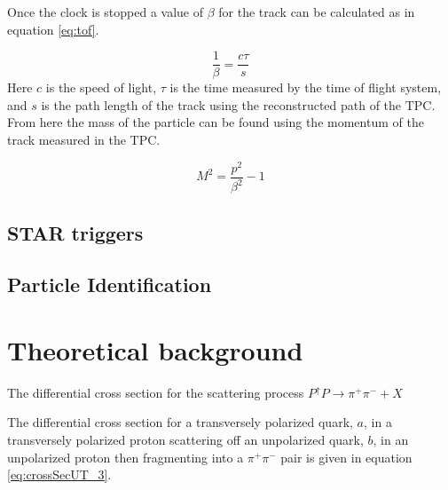 \documentclass[abstract = on,listof=totoc, bibliography=totoc]{scrreprt}
\newcommand{\phirs}{\phi_{RS}}
\newcommand{\ptpair}{P_{T}^{\pi^+\pi^-}}
\newcommand{\mpair}{M_{inv}^{\pi^+\pi^-}}
\newcommand{\pip}{\pi^+}
\newcommand{\pim}{\pi^-}
\newcommand{\pair}{$\pip\pim$ }
\begin{document}
Once the clock is stopped a value of $\beta$ for the track can be calculated as in equation \ref{eq:tof}. 

\begin{equation}
\label{eq:tof}
\frac{1}{\beta} = \frac{c\tau}{s}
\end{equation}
%
Here $c$ is the speed of light, $\tau$ is the time measured by the time of flight system, and $s$ is the path length of the track using the reconstructed path of the TPC. From here the mass of the particle can be found using the momentum of the track measured in the TPC.

\begin{equation}
\label{eq:mtof}
M^2 = \frac{p^2}{\beta^2} - 1
\end{equation}


\section{STAR triggers}

\section{Particle Identification}

\chapter{Theoretical background}

The differential cross section for the scattering process $P^\uparrow P \rightarrow \pip\pim + X$

The differential cross section for a transversely polarized quark, $a$, in a transversely polarized proton scattering off an unpolarized quark, $b$, in an unpolarized proton then fragmenting into a \pair pair is given in equation \ref{eq:crossSecUT_3}.\cite{bacchettaRedici2}


\end{document}
